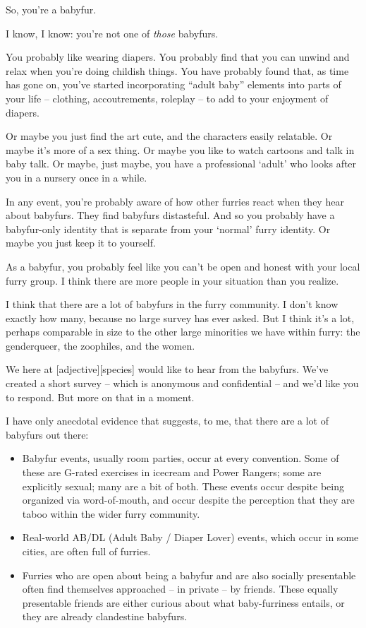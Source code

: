
So, you're a babyfur.

I know, I know: you're not one of \textit{those} babyfurs.

You probably like wearing diapers. You probably find that you can unwind and relax when you're doing childish things. You have probably found that, as time has gone on, you've started incorporating ``adult baby'' elements into parts of your life -- clothing, accoutrements, roleplay -- to add to your enjoyment of diapers.

Or maybe you just find the art cute, and the characters easily relatable. Or maybe it's more of a sex thing. Or maybe you like to watch cartoons and talk in baby talk. Or maybe, just maybe, you have a professional `adult' who looks after you in a nursery once in a while.

In any event, you're probably aware of how other furries react when they hear about babyfurs. They find babyfurs distasteful. And so you probably have a babyfur-only identity that is separate from your `normal' furry identity. Or maybe you just keep it to yourself.

As a babyfur, you probably feel like you can't be open and honest with your local furry group. I think there are more people in your situation than you realize.

I think that there are a lot of babyfurs in the furry community. I don't know exactly how many, because no large survey has ever asked. But I think it's a lot, perhaps comparable in size to the other large minorities we have within furry: the genderqueer, the zoophiles, and the women.

We here at [adjective][species] would like to hear from the babyfurs. We've created a short survey -- which is anonymous and confidential -- and we'd like you to respond. But more on that in a moment.

I have only anecdotal evidence that suggests, to me, that there are a lot of babyfurs out there:

\begin{itemize}
  \item Babyfur events, usually room parties, occur at every convention. Some of these are G-rated exercises in icecream and Power Rangers; some are explicitly sexual; many are a bit of both. These events occur despite being organized via word-of-mouth, and occur despite the perception that they are taboo within the wider furry community.
  \item Real-world AB/DL (Adult Baby / Diaper Lover) events, which occur in some cities, are often full of furries.
  \item Furries who are open about being a babyfur and are also socially presentable often find themselves approached -- in private -- by friends. These equally presentable friends are either curious about what baby-furriness entails, or they are already clandestine babyfurs.
\end{itemize}

